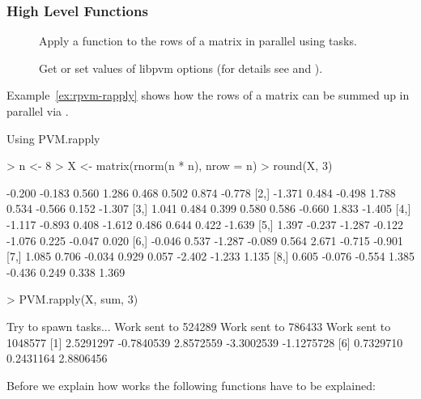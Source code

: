 \subsubsection{High Level Functions}
\begin{description}
\item[] Apply a function
   to the rows of a matrix  in
  parallel using  tasks.
\item[] Get or set values of libpvm
  options (for details see \cite{nali07rpvm} and \cite{geist94pvm}).
\end{description}

Example~\ref{ex:rpvm-rapply} shows how the rows of a matrix 
can be summed up in parallel via .

\begin{Example} Using PVM.rapply
\begin{Schunk}
\begin{Sinput}
> n <- 8
> X <- matrix(rnorm(n * n), nrow = n)
> round(X, 3)
\end{Sinput}
\begin{Soutput}
       [,1]   [,2]   [,3]   [,4]   [,5]   [,6]   [,7]   [,8]
[1,] -0.200 -0.183  0.560  1.286  0.468  0.502  0.874 -0.778
[2,] -1.371  0.484 -0.498  1.788  0.534 -0.566  0.152 -1.307
[3,]  1.041  0.484  0.399  0.580  0.586 -0.660  1.833 -1.405
[4,] -1.117 -0.893  0.408 -1.612  0.486  0.644  0.422 -1.639
[5,]  1.397 -0.237 -1.287 -0.122 -1.076  0.225 -0.047  0.020
[6,] -0.046  0.537 -1.287 -0.089  0.564  2.671 -0.715 -0.901
[7,]  1.085  0.706 -0.034  0.929  0.057 -2.402 -1.233  1.135
[8,]  0.605 -0.076 -0.554  1.385 -0.436  0.249  0.338  1.369
\end{Soutput}
\begin{Sinput}
> PVM.rapply(X, sum, 3)
\end{Sinput}
\begin{Soutput}
Try to spawn tasks...
Work sent to  524289 
Work sent to  786433 
Work sent to  1048577 
[1]  2.5291297 -0.7840539  2.8572559 -3.3002539 -1.1275728
[6]  0.7329710  0.2431164  2.8806456
\end{Soutput}
\end{Schunk}
\label{ex:rpvm-rapply}
\end{Example}

Before we explain how  works the following 
functions have to be explained:

